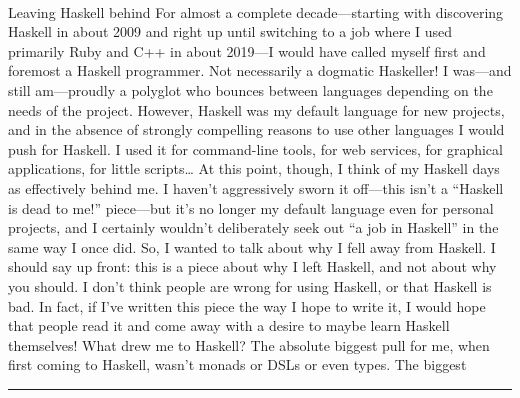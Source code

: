 \documentclass[10pt,a4paper]{article}
\begin{document}
\begin{multicols*}{2}
\paragraph{}
Leaving Haskell behind
For almost a complete decade—starting with discovering Haskell in about 2009 and right up until switching to a job where I used primarily Ruby and C++ in about 2019—I would have called myself first and foremost a Haskell programmer.
Not necessarily a dogmatic Haskeller! I was—and still am—proudly a polyglot who bounces between languages depending on the needs of the project. However, Haskell was my default language for new projects, and in the absence of strongly compelling reasons to use other languages I would push for Haskell. I used it for command-line tools, for web services, for graphical applications, for little scripts…
At this point, though, I think of my Haskell days as effectively behind me. I haven't aggressively sworn it off—this isn't a “Haskell is dead to me!” piece—but it's no longer my default language even for personal projects, and I certainly wouldn't deliberately seek out “a job in Haskell” in the same way I once did.
So, I wanted to talk about why I fell away from Haskell. I should say up front: this is a piece about why I left Haskell, and not about why you should. I don't think people are wrong for using Haskell, or that Haskell is bad. In fact, if I've written this piece the way I hope to write it, I would hope that people read it and come away with a desire to maybe learn Haskell themselves!
What drew me to Haskell?
The absolute biggest pull for me, when first coming to Haskell, wasn't monads or DSLs or even types. The biggest 
\par\noindent\textcolor{red}{\rule{\linewidth}{0.2mm}}
\vfill
\null
\noindent\begin{minipage}{\linewidth}

\end{minipage}
\end{multicols*}
\end{document}

